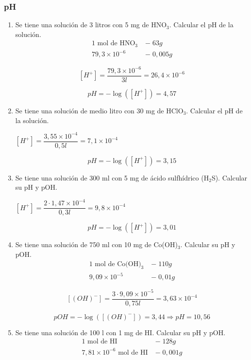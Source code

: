 \subsubsection*{pH}

\begin{enumerate}
\item Se tiene una solución de 3 litros con 5 mg de HNO$_3$. 
Calcular el pH de la solución.
\begin{align*}
\text{1 mol de HNO}_3 \;&-\; 63 g\\
 79,3\times 10^{-6} \;&-\; 0,005g
\end{align*}

$$[H^+] =  \dfrac{79,3\times 10^{-6}}{3l} = 26,4 \times 10^{-6}$$

$$pH=-\log([H^+]) = 4,57$$

\item Se tiene una solución de medio litro con 30 mg de HClO$_3$. Calcular el pH de la solución.

\hfil$[H^+] =  \dfrac{3,55\times 10^{-4}}{0,5l} = 
7,1 \times 10^{-4}$\hfil

$$pH=-\log([H^+]) = 3,15$$

\skipline
\item Se tiene una solución de 300 ml con 5 mg de ácido sulfhídrico (H$_2$S). Calcular su pH y pOH.

\hfil$[H^+] =  \dfrac{ 2\cdot 1,47\times 10^{-4}}{0,3l} = 
9,8 \times 10^{-4}$\hfil

$$pH=-\log([H^+]) = 3,01$$

\skipline
\item Se tiene una solución de 750 ml con 10 mg de Co(OH)$_3$. Calcular su pH y pOH.
\begin{align*}
\text{1 mol de Co(OH)}_3 \;&-\; 110 g\\
 9,09\times 10^{-5} \;&-\; 0,01g
\end{align*}

\skipline

$$[(OH)^-] =  \dfrac{ 3\cdot  9,09\times 10^{-5}}{0,75l} = 
3,63 \times 10^{-4}$$

$$pOH=-\log([(OH)^-]) = 3,44
\Rightarrow pH = 10,56$$

\skipline
\item Se tiene una solución de 100 l con 1 mg de HI. Calcular su pH y pOH.
\begin{align*}
\text{1 mol de HI} \;&-\; 128 g\\
 7,81\times 10^{-6} \text{ mol de HI} \;&-\; 0,001g
\end{align*}
\end{enumerate}
